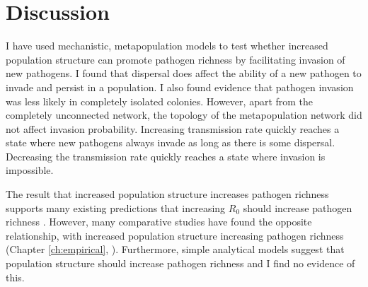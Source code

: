

\section{Discussion}\label{s:sims1Disc}



I have used mechanistic, metapopulation models to test whether increased population structure can promote pathogen richness by facilitating invasion of new pathogens.
I found that dispersal does affect the ability of a new pathogen to invade and persist in a population.
I also found evidence that pathogen invasion was less likely in completely isolated colonies.
However, apart from the completely unconnected network, the topology of the metapopulation network did not affect invasion probability.
Increasing transmission rate quickly reaches a state where new pathogens always invade as long as there is some dispersal.
Decreasing the transmission rate quickly reaches a state where invasion is impossible.

The result that increased population structure increases pathogen richness supports many existing predictions that increasing $R_0$ should increase pathogen richness \cite{nunn2003comparative, morand2000wormy, poulin2014parasite, poulin2000diversity, altizer2003social}.
However, many comparative studies have found the opposite relationship, with increased population structure increasing pathogen richness (Chapter \ref{ch:empirical}, \cites{vitone2004body, maganga2014bat, turmelle2009correlates}).
Furthermore, simple analytical models suggest that population structure should increase pathogen richness \cite{qiu2013vector, allen2004sis, nunes2006localized} and I find no evidence of this.



